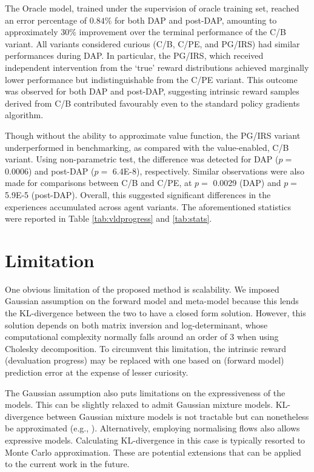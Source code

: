 \documentclass[utf8]{frontiersSCNS}
\begin{document}
The Oracle model, trained under the supervision of oracle training set, reached an error percentage of $0.84\%$ for both DAP and post-DAP, amounting to approximately 30\% improvement over the terminal performance of the C/B variant. All variants considered curious (C/B, C/PE, and PG/IRS) had similar performances during DAP. In particular, the PG/IRS, which received independent intervention from the `true' reward distributions achieved marginally lower performance but indistinguishable from the C/PE variant. This outcome was observed for both DAP and post-DAP, suggesting intrinsic reward samples derived from C/B contributed favourably even to the standard policy gradients algorithm. 

Though without the ability to approximate value function, the PG/IRS variant underperformed in benchmarking, as compared with the value-enabled, C/B variant. Using non-parametric test, the difference was detected for DAP ($p=$ 0.0006) and post-DAP ($p=$ 6.4E-8), respectively. Similar observations were also made for comparisons between C/B and C/PE, at $p=$ 0.0029 (DAP) and $p=$ 5.9E-5 (post-DAP). Overall, this suggested significant differences in the experiences accumulated across agent variants. The aforementioned statistics were reported in Table \ref{tab:vldprogress} and \ref{tab:stats}.

\section{Limitation}

One obvious limitation of the proposed method is scalability. We imposed Gaussian assumption on the forward model and meta-model because this lends the KL-divergence between the two to have a closed form solution. However, this solution depends on both matrix inversion and log-determinant, whose computational complexity normally falls around an order of 3 when using Cholesky decomposition. To circumvent this limitation, the intrinsic reward (devaluation progress) may be replaced with one based on (forward model) prediction error at the expense of lesser curiosity.

The Gaussian assumption also puts limitations on the expressiveness of the models. This can be slightly relaxed to admit Gaussian mixture models. KL-divergence between Gaussian mixture models is not tractable but can nonetheless be approximated (e.g., \cite{hershey2007approximating}). Alternatively, employing normalising flows \citep{rezende2015variational} also allows expressive models. Calculating KL-divergence in this case is typically resorted to Monte Carlo approximation. These are potential extensions that can be applied to the current work in the future.
\end{document}
